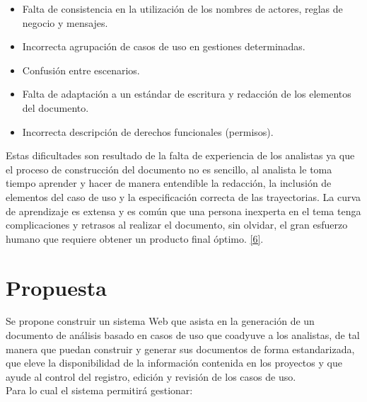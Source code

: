 \begin{itemize}
	\item Falta de consistencia en la utilización de los nombres de actores, reglas de negocio y mensajes.
	\item Incorrecta agrupación de casos de uso en gestiones determinadas.
	\item Confusión entre escenarios.
	\item Falta de adaptación a un estándar de escritura y redacción de los elementos del documento.
	\item Incorrecta descripción de derechos funcionales (permisos).
\end{itemize}

Estas dificultades son resultado de la falta de experiencia de los analistas ya que el proceso de construcción del documento no es sencillo, al analista le toma tiempo aprender y hacer de manera entendible la redacción, la inclusión de elementos del caso de uso y la especificación correcta de las trayectorias. La curva de aprendizaje es extensa y es común que una persona inexperta en el tema tenga complicaciones y retrasos al realizar el documento, sin olvidar, el gran esfuerzo humano que requiere obtener un producto final óptimo. \hyperlink{b06}{[6]}.

\section{Propuesta}

Se propone construir un sistema Web que asista en la generación de un documento de análisis basado en casos de uso que coadyuve a los analistas, de tal manera que puedan construir y generar sus documentos de forma estandarizada, que eleve la disponibilidad de la información contenida en los proyectos y que ayude al control del registro, edición y revisión de los casos de uso.\\

Para lo cual el sistema permitirá gestionar:

